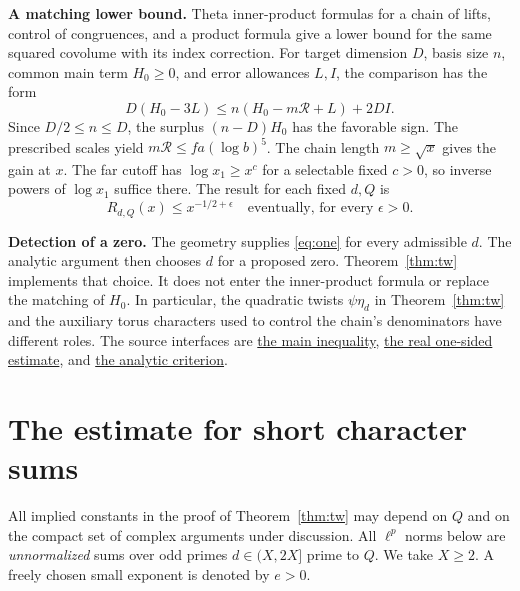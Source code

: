 \documentclass[11pt]{article}
\newcommand{\src}[3]{\href{https://github.com/VladimirReshetnikov/ProveIt/blob/d8415e76ad850651f8c0083afe689dd9f4a45a10/Analysis/GeneralizedRiemannHypothesis/vendor/grh-lean/grh/src/#1.lean\#L#2}{#3}}
\begin{document}
\textbf{A matching lower bound.} Theta inner-product formulas for a chain of lifts, control of congruences, and a product formula give a lower bound for the same squared covolume with its index correction. For target dimension $D$, basis size $n$, common main term $H_0\ge0$, and error allowances $L,I$, the comparison has the form
\[
 D(H_0-3L)\le n(H_0-m\mathcal R+L)+2DI.
\]
Since $D/2\le n\le D$, the surplus $(n-D)H_0$ has the favorable sign. The prescribed scales yield $m\mathcal R\le fa(\log b)^5$. The chain length $m\ge\sqrt{x}$ gives the gain at $x$. The far cutoff has $\log x_1\ge x^{c}$ for a selectable fixed $c>0$, so inverse powers of $\log x_1$ suffice there. The result for each fixed $d,Q$ is
\begin{equation}
 R_{d,Q}(x)\le x^{-1/2+\epsilon}\quad\text{eventually, for every }\epsilon>0.
 \label{eq:one}
\end{equation}

\textbf{Detection of a zero.} The geometry supplies \eqref{eq:one} for every admissible $d$. The analytic argument then chooses $d$ for a proposed zero. Theorem~\ref{thm:tw} implements that choice. It does not enter the inner-product formula or replace the matching of $H_0$. In particular, the quadratic twists $\psi\eta_d$ in Theorem~\ref{thm:tw} and the auxiliary torus characters used to control the chain's denominators have different roles. The source interfaces are \src{New/Reduction/MainInequality}{87}{the main inequality}, \src{New/Reduction/OneSidedBound}{200}{the real one-sided estimate}, and \src{New/Reduction/Zeros/Criterion}{37}{the analytic criterion}.

\newpage
\section{The estimate for short character sums}\label{sec:short}
All implied constants in the proof of Theorem~\ref{thm:tw} may depend on $Q$ and on the compact set of complex arguments under discussion. All $\ell^p$ norms below are \emph{unnormalized} sums over odd primes $d\in(X,2X]$ prime to $Q$. We take $X\ge 2$. A freely chosen small exponent is denoted by $e>0$.
\end{document}

